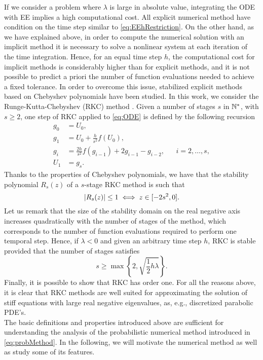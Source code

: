 If we consider a problem where $\lambda$ is large in absolute value, integrating the ODE with EE implies a high computational cost. All explicit numerical method have condition on the time step similar to \eqref{eq:EEhRestriction}. On the other hand, as we have explained above, in order to compute the numerical solution with an implicit method it is necessary to solve a nonlinear system at each iteration of the time integration. Hence, for an equal time step $h$, the computational cost for implicit methods is considerably higher than for explicit methods, and it is not possible to predict a priori the number of function evaluations needed to achieve a fixed tolerance. In order to overcome this issue, stabilized explicit methods based on Chebyshev polynomials have been studied. In this work, we consider the Runge-Kutta-Chebyshev (RKC) method \cite{HoK71}. Given a number of stages $s$ in $\mathbb{N}^*$, with $s \geq 2$, one step of RKC applied to \eqref{eq:ODE} is defined by the following recursion
\begin{equation}
\begin{aligned}
	g_0 &= U_0, \\
	g_1 &= U_0 + \frac{h}{s^2} f(U_0),\\
	g_i &= \frac{2h}{s^2}f(g_{i-1}) + 2g_{i-1} - g_{i-2}, && i = 2, \ldots, s, \\
	U_1 &= g_s.
\end{aligned}
\end{equation}
Thanks to the properties of Chebyshev polynomials, we have that the stability polynomial $R_s(z)$ of a $s$-stage RKC method is such that
\begin{equation}
	\abs{R_s(z)} \leq 1 \iff z \in [-2s^2, 0].
\end{equation}
Let us remark that the size of the stability domain on the real negative axis increases quadratically with the number of stages of the method, which corresponds to the number of function evaluations required to perform one temporal step. Hence, if $\lambda < 0$ and given an arbitrary time step $h$, RKC is stable provided that the number of stages satisfies
\begin{equation}
	s \geq \max\left\{2, \sqrt{\frac{1}{2}h\lambda}\right\}.
\end{equation}
Finally, it is possible to show that RKC has order one. For all the reasons above, it is clear that RKC methods are well suited for approximating the solution of stiff equations with large real negative eigenvalues, as, e.g., discretized parabolic PDE's. \\
The basic definitions and properties introduced above are sufficient for understanding the analysis of the probabilistic numerical method introduced in \eqref{eq:probMethod}. In the following, we will motivate the numerical method as well as study some of its features.

